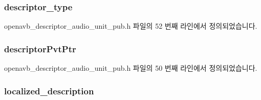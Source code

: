 \subsubsection[{\texorpdfstring{descriptor\+\_\+type}{descriptor_type}}]{ descriptor\+\_\+type}\hypertarget{structopenavb__aem__descriptor__audio__unit__t_a1e231d7874aada5925b29affc76782cc}{}\label{structopenavb__aem__descriptor__audio__unit__t_a1e231d7874aada5925b29affc76782cc}


openavb\+\_\+descriptor\+\_\+audio\+\_\+unit\+\_\+pub.\+h 파일의 52 번째 라인에서 정의되었습니다.

\subsubsection[{\texorpdfstring{descriptor\+Pvt\+Ptr}{descriptorPvtPtr}}]{ descriptor\+Pvt\+Ptr}\hypertarget{structopenavb__aem__descriptor__audio__unit__t_a302e92fd6cf4d398d5305395359fb157}{}\label{structopenavb__aem__descriptor__audio__unit__t_a302e92fd6cf4d398d5305395359fb157}


openavb\+\_\+descriptor\+\_\+audio\+\_\+unit\+\_\+pub.\+h 파일의 50 번째 라인에서 정의되었습니다.

\subsubsection[{\texorpdfstring{localized\+\_\+description}{localized_description}}]{ localized\+\_\+description}\hypertarget{structopenavb__aem__descriptor__audio__unit__t_afd613361c59409fb6dcc0c237d1cfbfd}{}\label{structopenavb__aem__descriptor__audio__unit__t_afd613361c59409fb6dcc0c237d1cfbfd}


